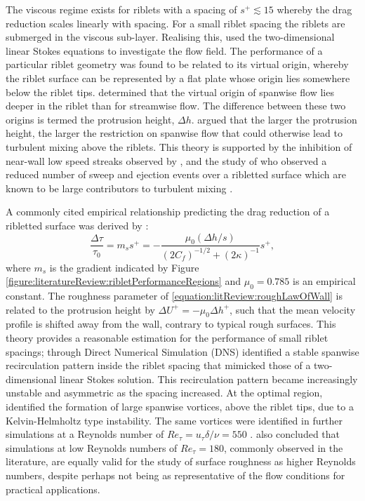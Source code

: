 \documentclass[12pt,oneside,a4paper]{article}
\begin{document}
%
The viscous regime exists for riblets with a spacing of $s^+  \lesssim 15$ whereby the drag reduction scales linearly with spacing. For a small riblet spacing the riblets are submerged in the viscous sub-layer. Realising this, \cite{luchini1991} used the two-dimensional linear Stokes equations to investigate the flow field. The performance of a particular riblet geometry was found to be related to its virtual origin, whereby the riblet surface can be represented by a flat plate whose origin lies somewhere below the riblet tips. \cite{luchini1991} determined that the virtual origin of spanwise flow lies deeper in the riblet than for streamwise flow. The difference between these two origins  is termed the protrusion height, $\Delta h$. \cite{luchini1991} argued that the larger the protrusion height, the larger the restriction on spanwise flow that could otherwise lead to turbulent mixing above the riblets. This theory is supported by the inhibition of near-wall low speed streaks observed by \cite{chu1993}, and the study of \cite{yang2016} who observed a reduced number of sweep and ejection events over a ribletted surface which are known to be large contributors to turbulent mixing \citep{pope2001}.

A commonly cited empirical relationship predicting the drag reduction of a ribletted surface was derived by \cite{bechert1997}:
\begin{equation}
\label{equation:literatureReview:ribletGradient}
\frac{\Delta \tau}{\tau_0} = m_s s^+ = - \frac{\mu_0 (\Delta h / s)}{(2 C_f)^{-1/2} + (2 \kappa)^{-1}}s^+,
\end{equation}
where $m_s$ is the gradient indicated by Figure \ref{figure:literatureReview:ribletPerformanceRegions} and $\mu_0 = 0.785$ is an empirical constant. The roughness parameter of 
\eqref{equation:litReview:roughLawOfWall} is related to the protrusion height by $\Delta U^+ = - \mu_0 \Delta h^+$, such that the mean velocity profile is shifted away from the wall, contrary to typical rough surfaces. This theory provides a reasonable estimation for the performance of small riblet spacings; through Direct Numerical Simulation (DNS) \cite{garcia2011a} identified a stable spanwise recirculation pattern inside the riblet spacing that mimicked those of a two-dimensional linear Stokes solution. This recirculation pattern became increasingly unstable and asymmetric as the spacing increased. At the optimal region, \cite{garcia2011a} identified the formation of large spanwise vortices, above the riblet tips, due to a Kelvin-Helmholtz type instability. The same vortices were identified in further simulations at a Reynolds number of $Re_\tau = u_\tau \delta / \nu = 550$ \citep{garcia2012}. \cite{garcia2012} also concluded that simulations at low Reynolds numbers of $Re_\tau = 180$, commonly observed in the literature, are equally valid for the study of surface roughness as higher Reynolds numbers, despite perhaps not being as representative of the flow conditions for practical applications. 
\end{document}
